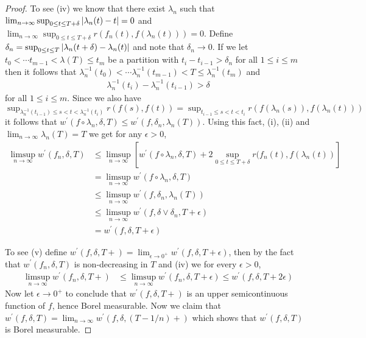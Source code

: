 \begin{proof}
To see (iv) we know that there exist $\lambda_n$ such that $\lim_{n \to \infty} \sup_{0 \leq t \leq T+\delta}\left \vert \lambda_n(t) - t \right \vert = 0$ and $\lim_{n \to \infty} \sup_{0 \leq t \leq T+\delta} r(f_n(t), f(\lambda_n(t))) = 0$.  Define $\delta_n = \sup_{0 \leq t \leq T}\left \vert \lambda_n(t+\delta) - \lambda_n(t) \right \vert$ and note that $\delta_n \to 0$.  If we let $t_0 < \dotsb t_{m-1} < \lambda(T) \leq t_m$ be a partition with $t_i - t_{i-1} > \delta_n$ for all $1 \leq i \leq m$ then it follows that $\lambda_n^{-1}(t_0) < \dotsb \lambda_n^{-1}(t_{m-1}) < T \leq \lambda_n^{-1}(t_m)$ and
\begin{align*}
\lambda^{-1}_n(t_i) - \lambda^{-1}_n(t_{i-1}) > \delta
\end{align*}
for all $1 \leq i \leq m$.  Since we also have $\sup_{\lambda^{-1}_n(t_{i-1})  \leq s < t < \lambda^{-1}_n(t_i) } r(f(s), f(t)) = \sup_{t_{i-1}  \leq s < t < t_i} r(f(\lambda_n(s)), f(\lambda_n(t)))$ it follows that $w^\prime(f \circ \lambda_n,\delta, T) \leq w^\prime(f,\delta_n, \lambda_n(T))$.  Using this fact, (i), (ii)  and $\lim_{n \to \infty} \lambda_n(T) = T$ we get for any $\epsilon > 0$,
\begin{align*}
\limsup_{n \to \infty}  w^\prime(f_n,\delta, T) 
&\leq \limsup_{n \to \infty} \left[ w^\prime(f \circ \lambda_n,\delta, T) + 2 \sup_{0 \leq t \leq T+\delta} r(f_n(t), f(\lambda_n(t)) \right] \\
&=\limsup_{n \to \infty}  w^\prime(f \circ \lambda_n,\delta, T) \\
&\leq \limsup_{n \to \infty}  w^\prime(f , \delta_n, \lambda_n(T)) \\
&\leq \limsup_{n \to \infty}  w^\prime(f , \delta \vee \delta_n, T+\epsilon) \\
&=w^\prime(f,\delta, T+\epsilon) 
\end{align*}

To see (v) define $w^\prime(f,\delta, T+) = \lim_{\epsilon \to 0^+} w^\prime(f,\delta, T+\epsilon)$, then by the fact that $w^\prime(f_n,\delta, T)$ is non-decreasing in $T$ and (iv) we for every $\epsilon > 0$,
\begin{align*}
\limsup_{n \to \infty}  w^\prime(f_n,\delta, T+) &\leq \limsup_{n \to \infty}  w^\prime(f_n,\delta, T+\epsilon) \leq w^\prime(f,\delta, T+2\epsilon) 
\end{align*}
Now let $\epsilon \to 0^+$ to conclude that  $w^\prime(f,\delta, T+)$ is an upper semicontinuous function of $f$, hence Borel measurable.  Now we claim that 
$w^\prime(f,\delta, T) = \lim_{n \to \infty} w^\prime(f,\delta, (T-1/n)+)$ which shows that $w^\prime(f,\delta, T)$ is Borel measurable.



\end{proof}
